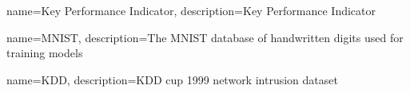 {
    name=Key Performance Indicator,
    description={Key Performance Indicator}
}

{
    name=MNIST,
    description={The MNIST database of handwritten digits used for training models}
}

{
    name=KDD,
    description={KDD cup 1999 network intrusion dataset}
}

